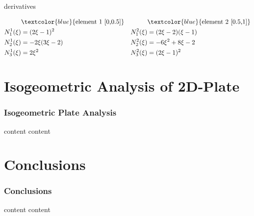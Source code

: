 \documentclass{beamer}
\begin{document}
\begin{frame}[allowframebreaks]
\begin{minipage}[b]{0.48\linewidth}
    \centering \footnotesize{derivatives}
  \end{minipage}
  \begin{equation}\nonumber
    \begin{aligned}
       & \textcolor{blue}{\text{element 1 [0,0.5]}}  & & \textcolor{blue}{\text{element 2 [0.5,1]}} \\
      N_1^1(\xi) &=  (2 \xi -1)^2 & N_1^2(\xi) &= (2\xi-2)(\xi-1)  \\
      N_2^1(\xi) &= -2\xi(3\xi-2) &N_2^2(\xi) &= -6\xi^2 + 8\xi -2 \\
      N_3^1(\xi) &=  2\xi^2       & N_3^2(\xi) &= (2\xi -1)^2 \\
    \end{aligned}
  \end{equation}


  \newpage



\end{frame}


\section{Isogeometric Analysis of 2D-Plate}
\begin{frame}[allowframebreaks] \frametitle{Isogeometric Plate Analysis}
  content
  \newpage
  content
  \newpage
\end{frame}



\section{Conclusions}
\begin{frame}[allowframebreaks] \frametitle{Conclusions}
  content
  \newpage
  content
  \newpage
\end{frame}

\end{document}

